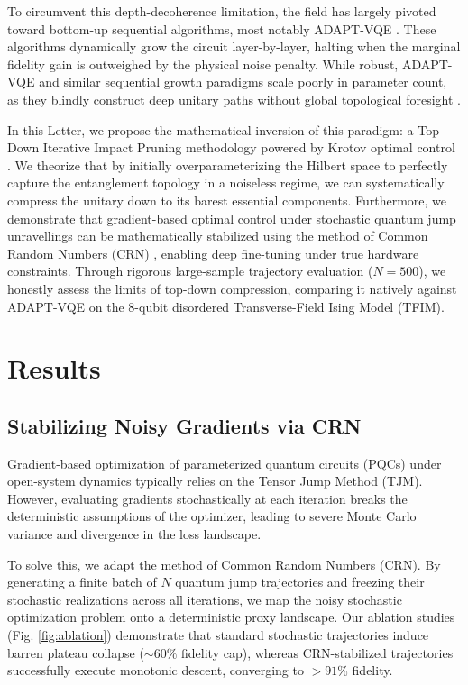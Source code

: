 \documentclass[aps,prl,twocolumn,superscriptaddress,notitlepage]{revtex4-2}
\begin{document}
To circumvent this depth-decoherence limitation, the field has largely pivoted toward bottom-up sequential algorithms, most notably ADAPT-VQE \cite{Grimsley2019}. These algorithms dynamically grow the circuit layer-by-layer, halting when the marginal fidelity gain is outweighed by the physical noise penalty. While robust, ADAPT-VQE and similar sequential growth paradigms scale poorly in parameter count, as they blindly construct deep unitary paths without global topological foresight \cite{Tang2021}.

In this Letter, we propose the mathematical inversion of this paradigm: a Top-Down Iterative Impact Pruning methodology powered by Krotov optimal control \cite{Krotov1995, Machnes2011}. We theorize that by initially overparameterizing the Hilbert space to perfectly capture the entanglement topology in a noiseless regime, we can systematically compress the unitary down to its barest essential components. Furthermore, we demonstrate that gradient-based optimal control under stochastic quantum jump unravellings \cite{Dalibard1992} can be mathematically stabilized using the method of Common Random Numbers (CRN) \cite{Glasserman2003}, enabling deep fine-tuning under true hardware constraints. Through rigorous large-sample trajectory evaluation ($N=500$), we honestly assess the limits of top-down compression, comparing it natively against ADAPT-VQE on the 8-qubit disordered Transverse-Field Ising Model (TFIM).

\section{Results}

\subsection{Stabilizing Noisy Gradients via CRN}
Gradient-based optimization of parameterized quantum circuits (PQCs) under open-system dynamics typically relies on the Tensor Jump Method (TJM). However, evaluating gradients stochastically at each iteration breaks the deterministic assumptions of the optimizer, leading to severe Monte Carlo variance and divergence in the loss landscape.

To solve this, we adapt the method of Common Random Numbers (CRN). By generating a finite batch of $N$ quantum jump trajectories and freezing their stochastic realizations across all iterations, we map the noisy stochastic optimization problem onto a deterministic proxy landscape. Our ablation studies (Fig. \ref{fig:ablation}) demonstrate that standard stochastic trajectories induce barren plateau collapse ($\sim 60\%$ fidelity cap), whereas CRN-stabilized trajectories successfully execute monotonic descent, converging to $>91\%$ fidelity.
\end{document}
